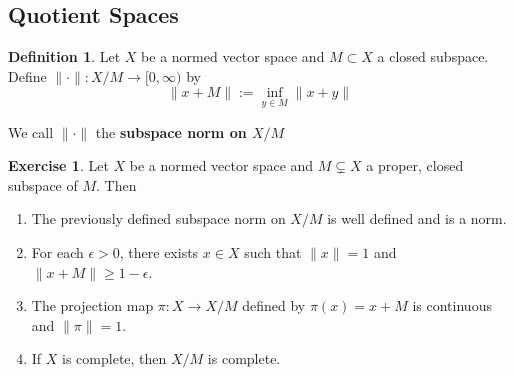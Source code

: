 \documentclass[12pt]{amsart}
\theoremstyle{definition}
\newtheorem{defn}[definition]{Definition}
\newtheorem{ex}[definition]{Exercise}
\newcommand{\ep}{\epsilon}
\newcommand{\Rg}{[0,\infty)}
\newcommand{\lex}[1]{\label{ex:#1}}
\newcommand{\ld}[1]{\label{defn:#1}}
\begin{document}
	
	
	
	
	
	
	
	
	
	
	
	
	
	
	
	
	
	
	
	
	
	\newpage
	\subsection{Quotient Spaces}	
	
	\begin{defn} \ld{}
		Let $X$ be a normed vector space and $M \subset X$ a closed subspace. Define $\|\cdot\|:X/M \rightarrow \Rg$ by $$\|x+M\| := \inf_{y \in M}\|x+y\|$$
		
		We call $\|\cdot\|$ the \textbf{subspace norm on $X/M$}
	\end{defn}
	
	\begin{ex} \lex{}
		Let $X$ be a normed vector space and $M \subsetneq X$ a proper, closed subspace of $M$. 
		Then 
		\begin{enumerate}
			\item The previously defined subspace norm on $X/M$ is well defined and is a norm. 
			\item For each $\ep > 0$, there exists $x \in X$ such that $\|x\|=1$ and $\|x+M\| \geq 1-\ep$.
			\item The projection map $\pi:X \rightarrow X/M$ defined by $\pi(x) = x+M$ is continuous and $\|\pi\|=1$. 
			\item If $X$ is complete, then $X/M$ is complete. 
		\end{enumerate} 
	\end{ex}
	
\end{document}
